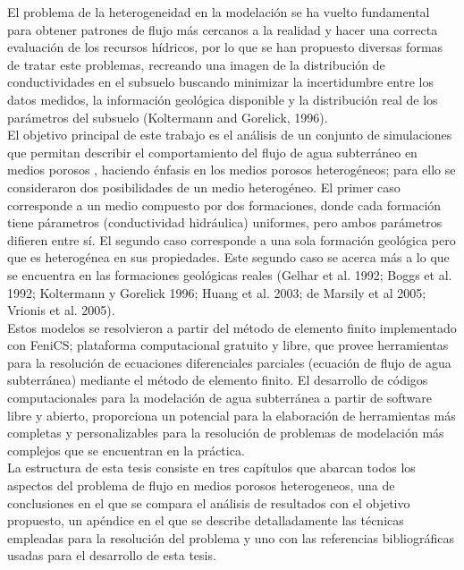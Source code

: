 El problema de la heterogeneidad en la modelación se ha vuelto fundamental para obtener patrones de flujo más cercanos a la realidad y hacer una correcta evaluación de los recursos hídricos, por lo que se han propuesto diversas formas de tratar este problemas,  recreando una imagen de la distribución de conductividades en el subsuelo buscando minimizar la incertidumbre entre los datos medidos, la información geológica disponible y la distribución real de los parámetros del subsuelo (Koltermann and Gorelick, 1996)\cite{Kolter1996}.
\\


El objetivo principal de este trabajo es el análisis de un conjunto de simulaciones que permitan describir el comportamiento del flujo de agua subterráneo en medios porosos , haciendo énfasis en los medios porosos heterogéneos; para ello se consideraron dos posibilidades de un medio heterogéneo. El primer caso corresponde a un medio compuesto por dos formaciones, donde cada formación tiene párametros (conductividad hidráulica) uniformes, pero ambos parámetros difieren entre sí. El segundo caso corresponde a una sola formación geológica pero que es heterogénea en sus propiedades. Este segundo caso se acerca más a lo que se encuentra en las formaciones geológicas reales (Gelhar et al. 1992; Boggs et al. 1992; Koltermann y Gorelick 1996; Huang et al. 2003; de Marsily et al 2005; Vrionis et al. 2005).
\\

Estos modelos se resolvieron a partir del método de elemento finito implementado con FeniCS; plataforma computacional gratuito y libre, que provee herramientas para la resolución de ecuaciones diferenciales parciales (ecuación de flujo de agua subterránea) mediante el método de elemento finito. El desarrollo de códigos computacionales para la modelación de agua subterránea a partir de software libre y abierto, proporciona un potencial para la elaboración de herramientas más completas y personalizables para la resolución de problemas de modelación más complejos que se encuentran en la práctica. 
\\
 
La estructura de esta tesis consiste en tres capítulos que abarcan todos los aspectos del problema de flujo en medios porosos heterogeneos, una de conclusiones en el que se compara el análisis de resultados con el objetivo propuesto, un apéndice en el que se describe detalladamente las técnicas empleadas para la resolución del problema y uno con las referencias bibliográficas usadas para el desarrollo de esta tesis.   
\\ 
 
